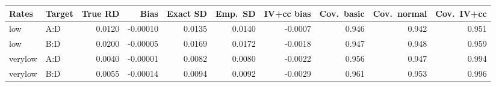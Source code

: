 \begin{tabular}{llrrrrrrrr}
\toprule
Rates & Target & True RD & Bias & Exact SD & Emp.\ SD & IV+cc bias & Cov.\ basic & Cov.\ normal & Cov.\ IV+cc \\
\midrule
low & A:D & 0.0120 & -0.00010 & 0.0135 & 0.0140 & -0.0007 & 0.946 & 0.942 & 0.951 \\
low & B:D & 0.0200 & -0.00005 & 0.0169 & 0.0172 & -0.0018 & 0.947 & 0.948 & 0.959 \\
verylow & A:D & 0.0040 & -0.00001 & 0.0082 & 0.0080 & -0.0022 & 0.956 & 0.947 & 0.994 \\
verylow & B:D & 0.0055 & -0.00014 & 0.0094 & 0.0092 & -0.0029 & 0.961 & 0.953 & 0.996 \\
\bottomrule
\end{tabular}
